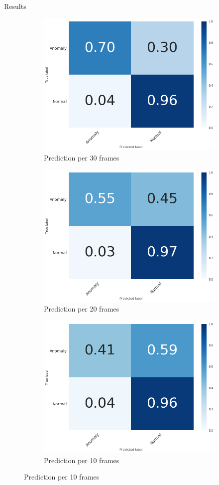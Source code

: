 \documentclass{beamer}
\begin{document}
\begin{frame}{Results}
   \begin{figure}[h!]
    	\begin{subfigure}[t]{0.3\textwidth}
    		
    		\centering
    		\includegraphics[width=0.65\linewidth]{images/30_cfmat.png}
    		
    		\caption{Prediction per 30 frames}
    	\end{subfigure}   
    	\begin{subfigure}[t]{.3\textwidth}
    		\centering
    		\includegraphics[width=0.65\linewidth]{images/20_cfmat.png}
    		\caption{Prediction per 20 frames }
    		
    	\end{subfigure}\hfill%
    	\begin{subfigure}[t]{.3\textwidth}
    		\centering
    		\includegraphics[width=0.65\linewidth]{images/10_cfmat.png}
    		\caption{Prediction per 10 frames}
    		

\end{subfigure}
\end{figure}
\end{frame}
\end{document}

